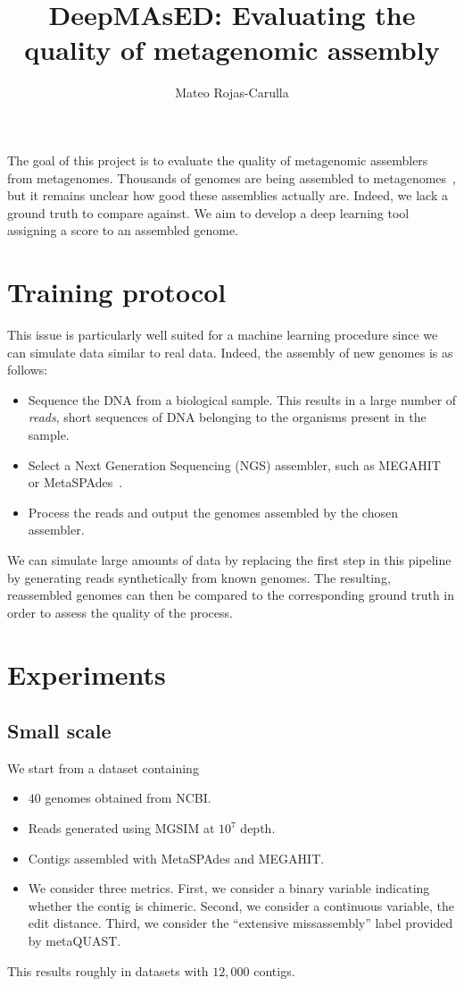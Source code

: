 \documentclass{scrartcl}
\title{\LARGE DeepMAsED: Evaluating the quality of metagenomic assembly}
\author{\large Mateo Rojas-Carulla
}
\date{}
\begin{document}
\maketitle

The goal of this project is to evaluate the quality of metagenomic assemblers from metagenomes. 
Thousands of genomes are being assembled to metagenomes~\citep{pasolli2019extensive}, but it remains unclear 
how good these assemblies actually are. Indeed, we lack a ground truth to compare against. We aim to develop a 
deep learning tool assigning a score to an assembled genome.

\section{Training protocol}

This issue is particularly well suited for a machine learning procedure since we can simulate data similar to real data. Indeed, 
the assembly of new genomes is as follows:
\begin{itemize}
  \item Sequence the DNA from a biological sample. This results in a large number of \emph{reads}, short sequences of DNA belonging 
    to the organisms present in the sample. 
  \item Select a Next Generation Sequencing (NGS) assembler, such as MEGAHIT~\citep{li2015megahit} or MetaSPAdes~\citep{nurk2017metaspades}. 
  \item Process the reads and output the genomes assembled by the chosen assembler. 
\end{itemize}

We can simulate large amounts of data by replacing the first step in this pipeline by generating reads synthetically from known genomes. 
The resulting, reassembled genomes can then be compared to the corresponding ground truth in order to assess the quality of the 
process. 

\section{Experiments}
\subsection{Small scale}
We start from a dataset containing 
\begin{itemize}
  \item $40$ genomes obtained from NCBI. 
  \item Reads generated using MGSIM at $10^7$ depth. 
  \item Contigs assembled with MetaSPAdes and MEGAHIT. 
  \item We consider three metrics. First, we consider a binary variable indicating whether the contig is chimeric. Second, we 
    consider a continuous variable, the edit distance. Third, we consider the ``extensive missassembly'' label provided by 
    metaQUAST. 
\end{itemize}

This results roughly in datasets with $12,000$ contigs. 




\end{document}
